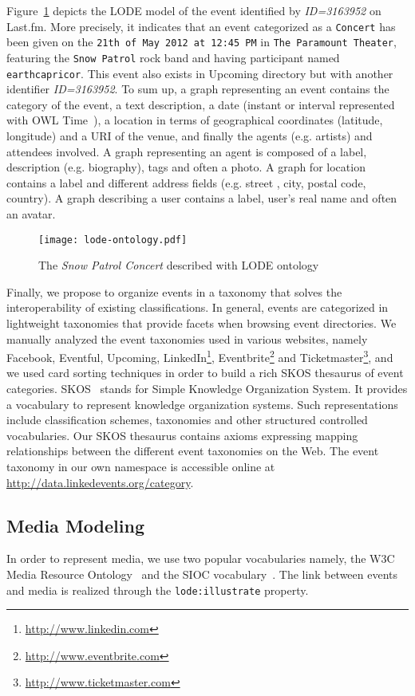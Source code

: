 Figure~\ref{fig:lode-ontology} depicts the LODE model of the event identified by \emph{ID=3163952} on Last.fm. More precisely, it indicates that an event categorized as a \texttt{Concert} has been given on the \texttt{21th of May 2012 at 12:45 PM} in \texttt{The Paramount Theater}, featuring the \texttt{Snow Patrol} rock band and having participant named \texttt{earthcapricor}. This event also exists in Upcoming directory but with another identifier \emph{ID=3163952}. To sum up, a graph representing an event contains the category of the event, a text description, a date (instant or interval represented with OWL Time~\cite{OwlTime:2013}),  a location in terms of geographical coordinates (latitude, longitude) and a URI of the venue, and finally the agents (e.g. artists) and attendees involved. A graph representing an agent is composed of a label, description (e.g. biography), tags and often a photo. A graph for location contains a label and different address fields (e.g. street , city, postal code, country). A graph describing a user contains a label, user's real name and often an avatar.

\begin{figure}[htb]
  \centering
  \texttt{[image: lode-ontology.pdf]}
    \caption{The \emph{Snow Patrol Concert} described with LODE ontology}
  \label{fig:lode-ontology}
\end{figure}

Finally, we propose to organize events in a taxonomy that solves the interoperability of existing classifications. In general, events are categorized in lightweight taxonomies that provide facets when browsing event directories. We manually analyzed the event taxonomies used in various websites, namely Facebook, Eventful, Upcoming, LinkedIn\footnote{\url{http://www.linkedin.com}}, Eventbrite\footnote{\url{http://www.eventbrite.com}} and Ticketmaster\footnote{\url{http://www.ticketmaster.com}}, and we used card sorting techniques in order to build a rich SKOS thesaurus of event categories. SKOS~\cite{SKOS:2009} stands for Simple Knowledge Organization System. It provides a vocabulary to represent knowledge organization systems. Such representations include classification schemes, taxonomies and other structured controlled vocabularies. Our SKOS thesaurus contains axioms expressing mapping relationships between the different event taxonomies on the Web. The event taxonomy in our own namespace is accessible online at \url{http://data.linkedevents.org/category}. 

\subsection{Media Modeling}
In order to represent media, we use two popular vocabularies namely, the W3C Media Resource Ontology~\cite{MediaOnt:2009} and the SIOC vocabulary~\cite{SIOC:2010}. The link between events and media is realized through the \texttt{lode:illustrate} property. 

